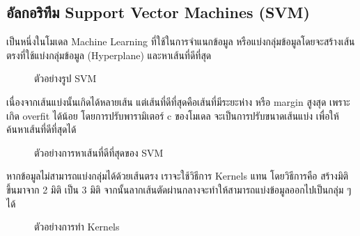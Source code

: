 \subsection{อัลกอริทึม Support Vector Machines (SVM)}
เป็นหนึ่งในโมเดล Machine Learning ที่ใช้ในการจำแนกข้อมูล หรือแบ่งกลุ่มข้อมูลโดยจะสร้างเส้นตรงที่ใช้แบ่งกลุ่มข้อมูล (Hyperplane) และหาเส้นที่ดีที่สุด
\begin{figure}[H]\centering
      \setlength{\fboxrule}{0.2mm}
      \setlength{\fboxsep}{0.5cm}
      \caption{ตัวอย่างรูป SVM}\label{fig:svm_example1}
\end{figure}

\par เนื่องจากเส้นแบ่งนั้นเกิดได้หลายเส้น แต่เส้นที่ดีที่สุดคือเส้นที่มีระยะห่าง หรือ margin สูงสุด เพราะเกิด overfit ได้น้อย โดยการปรับพารามิเตอร์ c ของโมเดล จะเป็นการปรับขนาดเส้นแบ่ง เพื่อให้ค้นหาเส้นที่ดีที่สุดได้
\begin{figure}[H]\centering
      \setlength{\fboxrule}{0.2mm}
      \setlength{\fboxsep}{0.5cm}
      \caption{ตัวอย่างการหาเส้นที่ดีที่สุดของ SVM}\label{fig:svm_example2}
\end{figure}

\par หากข้อมูลไม่สามารถแบ่งกลุ่มได้ด้วยเส้นตรง เราจะใช้วิธีการ Kernels แทน โดยวิธีการคือ สร้างมิติขึ้นมาจาก 2 มิติ เป็น 3 มิติ จากนั้นลากเส้นตัดผ่านกลางจะทำให้สามารถแบ่งข้อมูลออกไปเป็นกลุ่ม ๆ ได้
\begin{figure}[H]\centering
      \setlength{\fboxrule}{0.2mm}
      \setlength{\fboxsep}{0.5cm}
      \caption{ตัวอย่างการทำ Kernels}\label{fig:svm_example3}
\end{figure}

